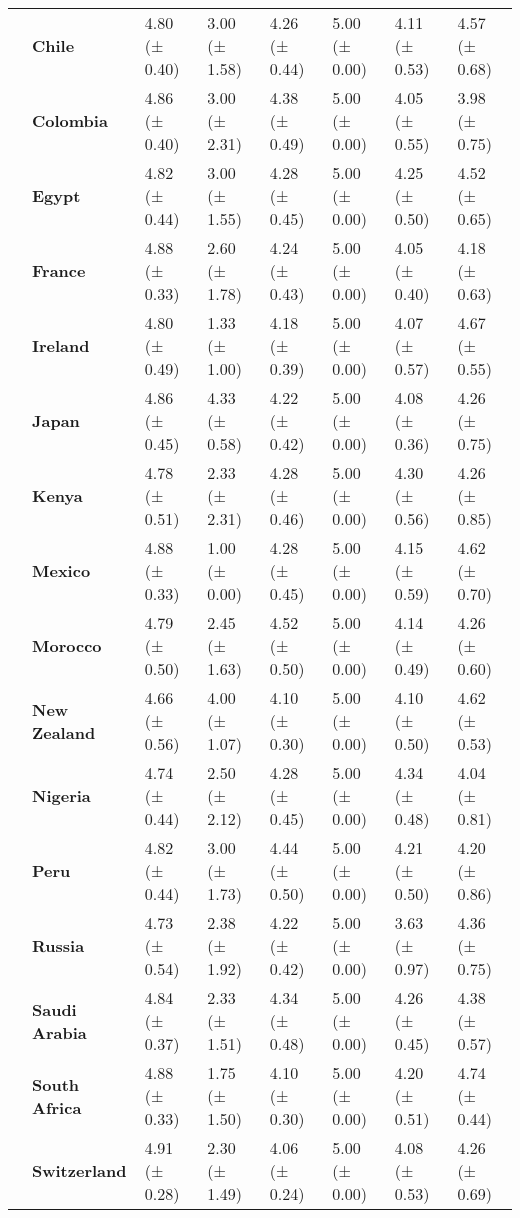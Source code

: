\begin{longtable}{llllllll}
\textbf{} & \textbf{Chile} & 4.80 (± 0.40) & 3.00 (± 1.58) & 4.26 (± 0.44) & 5.00 (± 0.00) & 4.11 (± 0.53) & 4.57 (± 0.68) \\
\textbf{} & \textbf{Colombia} & 4.86 (± 0.40) & 3.00 (± 2.31) & 4.38 (± 0.49) & 5.00 (± 0.00) & 4.05 (± 0.55) & 3.98 (± 0.75) \\
\textbf{} & \textbf{Egypt} & 4.82 (± 0.44) & 3.00 (± 1.55) & 4.28 (± 0.45) & 5.00 (± 0.00) & 4.25 (± 0.50) & 4.52 (± 0.65) \\
\textbf{} & \textbf{France} & 4.88 (± 0.33) & 2.60 (± 1.78) & 4.24 (± 0.43) & 5.00 (± 0.00) & 4.05 (± 0.40) & 4.18 (± 0.63) \\
\textbf{} & \textbf{Ireland} & 4.80 (± 0.49) & 1.33 (± 1.00) & 4.18 (± 0.39) & 5.00 (± 0.00) & 4.07 (± 0.57) & 4.67 (± 0.55) \\
\textbf{} & \textbf{Japan} & 4.86 (± 0.45) & 4.33 (± 0.58) & 4.22 (± 0.42) & 5.00 (± 0.00) & 4.08 (± 0.36) & 4.26 (± 0.75) \\
\textbf{} & \textbf{Kenya} & 4.78 (± 0.51) & 2.33 (± 2.31) & 4.28 (± 0.46) & 5.00 (± 0.00) & 4.30 (± 0.56) & 4.26 (± 0.85) \\
\textbf{} & \textbf{Mexico} & 4.88 (± 0.33) & 1.00 (± 0.00) & 4.28 (± 0.45) & 5.00 (± 0.00) & 4.15 (± 0.59) & 4.62 (± 0.70) \\
\textbf{} & \textbf{Morocco} & 4.79 (± 0.50) & 2.45 (± 1.63) & 4.52 (± 0.50) & 5.00 (± 0.00) & 4.14 (± 0.49) & 4.26 (± 0.60) \\
\textbf{} & \textbf{New Zealand} & 4.66 (± 0.56) & 4.00 (± 1.07) & 4.10 (± 0.30) & 5.00 (± 0.00) & 4.10 (± 0.50) & 4.62 (± 0.53) \\
\textbf{} & \textbf{Nigeria} & 4.74 (± 0.44) & 2.50 (± 2.12) & 4.28 (± 0.45) & 5.00 (± 0.00) & 4.34 (± 0.48) & 4.04 (± 0.81) \\
\textbf{} & \textbf{Peru} & 4.82 (± 0.44) & 3.00 (± 1.73) & 4.44 (± 0.50) & 5.00 (± 0.00) & 4.21 (± 0.50) & 4.20 (± 0.86) \\
\textbf{} & \textbf{Russia} & 4.73 (± 0.54) & 2.38 (± 1.92) & 4.22 (± 0.42) & 5.00 (± 0.00) & 3.63 (± 0.97) & 4.36 (± 0.75) \\
\textbf{} & \textbf{Saudi Arabia} & 4.84 (± 0.37) & 2.33 (± 1.51) & 4.34 (± 0.48) & 5.00 (± 0.00) & 4.26 (± 0.45) & 4.38 (± 0.57) \\
\textbf{} & \textbf{South Africa} & 4.88 (± 0.33) & 1.75 (± 1.50) & 4.10 (± 0.30) & 5.00 (± 0.00) & 4.20 (± 0.51) & 4.74 (± 0.44) \\
\textbf{} & \textbf{Switzerland} & 4.91 (± 0.28) & 2.30 (± 1.49) & 4.06 (± 0.24) & 5.00 (± 0.00) & 4.08 (± 0.53) & 4.26 (± 0.69) \\

\end{longtable}

